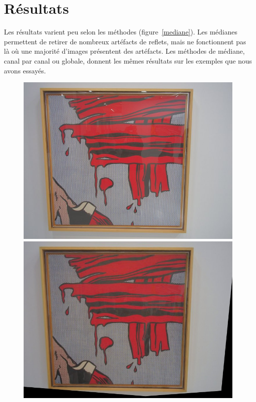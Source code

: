 \documentclass[12pt,a4paper]{article}
\begin{document}
\section{Résultats}
Les résultats varient peu selon les méthodes (figure~\ref{mediane}). Les médianes permettent de retirer de nombreux artéfacts de reflets, mais ne fonctionnent pas là où une majorité d'images présentent des artéfacts. Les méthodes de médiane, canal par canal ou globale, donnent les mêmes résultats sur les exemples que nous avons essayés.
\begin{figure}
\centering
\begin{minipage}{0.6\linewidth}
\includegraphics[width=\textwidth]{Fig/reference.jpg}
\end{minipage}
\begin{minipage}{0.6\linewidth}
\includegraphics[width=\textwidth]{Fig/merge_min.jpg}

\end{minipage}
\end{figure}
\end{document}
